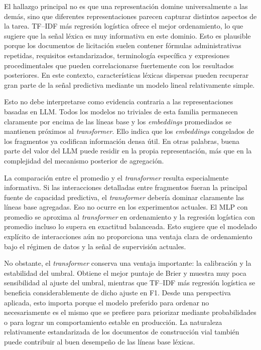 El hallazgo principal no es que una representación domine universalmente a las demás, sino que diferentes representaciones parecen capturar distintos aspectos de la tarea. TF--IDF más regresión logística ofrece el mejor ordenamiento, lo que sugiere que la señal léxica es muy informativa en este dominio. Esto es plausible porque los documentos de licitación suelen contener fórmulas administrativas repetidas, requisitos estandarizados, terminología específica y expresiones procedimentales que pueden correlacionarse fuertemente con los resultados posteriores. En este contexto, características léxicas dispersas pueden recuperar gran parte de la señal predictiva mediante un modelo lineal relativamente simple.

Esto no debe interpretarse como evidencia contraria a las representaciones basadas en LLM. Todos los modelos no triviales de esta familia permanecen claramente por encima de las líneas base y los \textit{embeddings} promediados se mantienen próximos al \textit{transformer}. Ello indica que los \textit{embeddings} congelados de los fragmentos ya codifican información densa útil. En otras palabras, buena parte del valor del LLM puede residir en la propia representación, más que en la complejidad del mecanismo posterior de agregación.

La comparación entre el promedio y el \textit{transformer} resulta especialmente informativa. Si las interacciones detalladas entre fragmentos fueran la principal fuente de capacidad predictiva, el \textit{transformer} debería dominar claramente las líneas base agregadas. Eso no ocurre en los experimentos actuales. El MLP con promedio se aproxima al \textit{transformer} en ordenamiento y la regresión logística con promedio incluso lo supera en exactitud balanceada. Esto sugiere que el modelado explícito de interacciones aún no proporciona una ventaja clara de ordenamiento bajo el régimen de datos y la señal de supervisión actuales.

No obstante, el \textit{transformer} conserva una ventaja importante: la calibración y la estabilidad del umbral. Obtiene el mejor puntaje de Brier y muestra muy poca sensibilidad al ajuste del umbral, mientras que TF--IDF más regresión logística se beneficia considerablemente de dicho ajuste en F1. Desde una perspectiva aplicada, esto importa porque el modelo preferido para ordenar no necesariamente es el mismo que se prefiere para priorizar mediante probabilidades o para lograr un comportamiento estable en producción. La naturaleza relativamente estandarizada de los documentos de construcción vial también puede contribuir al buen desempeño de las líneas base léxicas.

